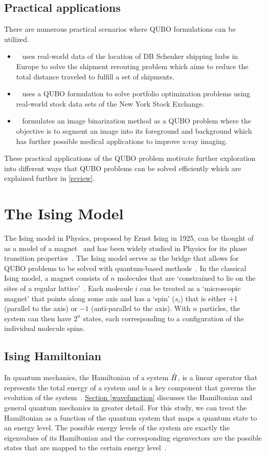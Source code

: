 \subsection{Practical applications}
There are numerous practical scenarios where QUBO formulations can be utilized. 
\begin{itemize}
    \item~\cite{b7} uses real-world data of the location of DB Schenker shipping hubs in Europe to solve the shipment rerouting problem which aims to reduce the total distance traveled to fulfill a set of shipments.
    \item~\cite{b8} uses a QUBO formulation to solve portfolio optimization problems using real-world stock data sets of the New York Stock Exchange.
    \item~\cite{b9} formulates an image binarization method as a QUBO problem where the objective is to segment an image into its foreground and background which has further possible medical applications to improve x-ray imaging.
\end{itemize}
These practical applications of the QUBO problem motivate further exploration into different ways that QUBO problems can be solved efficiently which are explained further in \autoref{review}.

\section{The Ising Model}
The Ising model in Physics, proposed by Ernst Ising in 1925, can be thought of as a model of a magnet~\cite{isingising} and has been widely studied in Physics for its phase transition properties~\cite{cipra1987introduction}. The Ising model serves as the bridge that allows for QUBO problems to be solved with quantum-based methods~\cite{b10}. In the classical Ising model, a magnet consists of $n$ molecules that are `constrained to lie on the sites of a regular lattice'~\cite{b11}. Each molecule $i$ can be treated as a `microscopic magnet' that points along some axis and has a `spin' ($s_i$) that is either $+1$ (parallel to the axis) or $-1$ (anti-parallel to the axis). With $n$ particles, the system can then have $2^n$ states, each corresponding to a configuration of the individual molecule spins.


\subsection{Ising Hamiltonian}
In quantum mechanics, the Hamiltonian of a system $\Hat{H}$, is a linear operator that represents the total energy of a system and is a key component that governs the evolution of the system~\cite{GriffithsSchroeter2018}. \hyperref[sdd_1]{Section \ref{wavefunction}} discusses the Hamiltonian and general quantum mechanics in greater detail. For this study, we can treat the Hamiltonian as a function of the quantum system that maps a quantum state to an energy level. The possible energy levels of the system are exactly the eigenvalues of its Hamiltonian and the corresponding eigenvectors are the possible states that are mapped to the certain energy level~\cite{b21}. 


